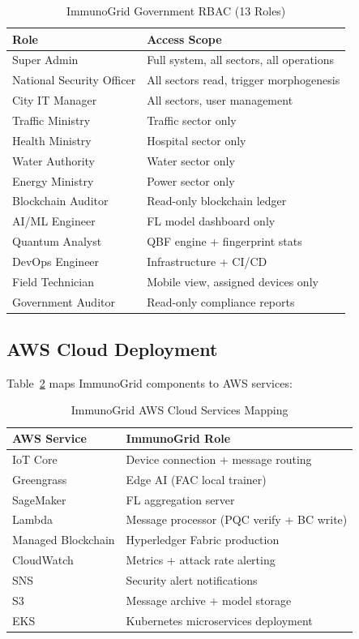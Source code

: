 \begin{table}[h]
\caption{ImmunoGrid Government RBAC (13 Roles)}
\label{tab:rbac}
\centering
\small
\begin{tabular}{lp{5cm}}
\toprule
\textbf{Role} & \textbf{Access Scope} \\
\midrule
Super Admin & Full system, all sectors, all operations \\
National Security Officer & All sectors read, trigger morphogenesis \\
City IT Manager & All sectors, user management \\
Traffic Ministry & Traffic sector only \\
Health Ministry & Hospital sector only \\
Water Authority & Water sector only \\
Energy Ministry & Power sector only \\
Blockchain Auditor & Read-only blockchain ledger \\
AI/ML Engineer & FL model dashboard only \\
Quantum Analyst & QBF engine + fingerprint stats \\
DevOps Engineer & Infrastructure + CI/CD \\
Field Technician & Mobile view, assigned devices only \\
Government Auditor & Read-only compliance reports \\
\bottomrule
\end{tabular}
\end{table}

\subsection{AWS Cloud Deployment}

Table~\ref{tab:aws_services} maps ImmunoGrid components to AWS services:

\begin{table}[h]
\caption{ImmunoGrid AWS Cloud Services Mapping}
\label{tab:aws_services}
\centering
\begin{tabular}{ll}
\toprule
\textbf{AWS Service} & \textbf{ImmunoGrid Role} \\
\midrule
IoT Core    & Device connection + message routing \\
Greengrass  & Edge AI (FAC local trainer) \\
SageMaker   & FL aggregation server \\
Lambda      & Message processor (PQC verify + BC write) \\
Managed Blockchain & Hyperledger Fabric production \\
CloudWatch  & Metrics + attack rate alerting \\
SNS         & Security alert notifications \\
S3          & Message archive + model storage \\
EKS         & Kubernetes microservices deployment \\
\bottomrule
\end{tabular}
\end{table}

